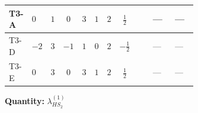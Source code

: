\documentclass[8pt]{article}
\begin{document}
\begin{landscape}
\begin{longtable}{@{}llcccccc >{\raggedright\arraybackslash}p{0.21\linewidth} >{\raggedright\arraybackslash}p{0.21\linewidth} >{\raggedright\arraybackslash}p{0.21\linewidth}@{}}
\midrule
T3-A & $0$ & $1$ & $0$ & $3$ & $1$ & $2$ & $\frac{1}{2}$ & \scriptsize\adjustbox{max width=\linewidth}{$\begin{gathered} +4 {\lambda_5} \left({\lambda_5}\right)^{*}\end{gathered}$} & --- & --- \\
\midrule
T3-D & $-2$ & $3$ & $-1$ & $1$ & $0$ & $2$ & $-\frac{1}{2}$ & \scriptsize\adjustbox{max width=\linewidth}{$\begin{gathered} +12 {\lambda_5} \left({\lambda_5}\right)^{*}\end{gathered}$} & --- & --- \\
\midrule
T3-E & $0$ & $3$ & $0$ & $3$ & $1$ & $2$ & $\frac{1}{2}$ & \scriptsize\adjustbox{max width=\linewidth}{$\begin{gathered} +4 {\lambda_5} \left({\lambda_5}\right)^{*}\end{gathered}$} & --- & --- \\
\midrule
\bottomrule
\end{longtable}
\clearpage
\noindent\textbf{Quantity: }$\lambda_{HS_2}^{(1)}$\par\smallskip

\end{landscape}
\end{document}
